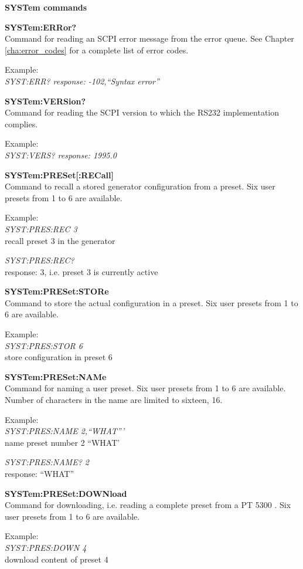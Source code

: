 \textbf{SYSTem commands}

\textbf{SYSTem:ERRor?}\\
Command for reading an SCPI error message from the error queue. See Chapter \ref{cha:error_codes} for a complete list of error codes.

Example:\\
\textit{SYST:ERR? response: -102,``Syntax error''}

\textbf{SYSTem:VERSion?}\\
Command for reading the SCPI version to which the RS232 implementation complies.

Example:\\
\textit{SYST:VERS? response: 1995.0}

\textbf{SYSTem:PRESet[:RECall]}\\
Command to recall a stored generator configuration from a preset. Six user presets from 1 to 6 are available.

Example:\\
\textit{SYST:PRES:REC 3}\\
recall preset 3 in the generator

\textit{SYST:PRES:REC?}\\
response: 3, i.e. preset 3 is currently active

\textbf{SYSTem:PRESet:STORe}\\
Command to store the actual configuration in a preset. Six user presets from 1 to 6 are available.

Example:\\
\textit{SYST:PRES:STOR 6}\\
store configuration in preset 6

\textbf{SYSTem:PRESet:NAMe}\\
Command for naming a user preset. Six user presets from 1 to 6 are available. Number of characters in the name are limited to sixteen, 16.

Example:\\
\textit{SYST:PRES:NAME 2,``WHAT'''}\\
name preset number 2 ``WHAT'

\textit{SYST:PRES:NAME? 2}\\
response: ``WHAT''

\textbf{SYSTem:PRESet:DOWNload}\\
Command for downloading, i.e. reading a complete preset from a PT 5300 . Six user presets from 1 to 6 are available.

Example:\\
\textit{SYST:PRES:DOWN 4}\\
download content of preset 4

